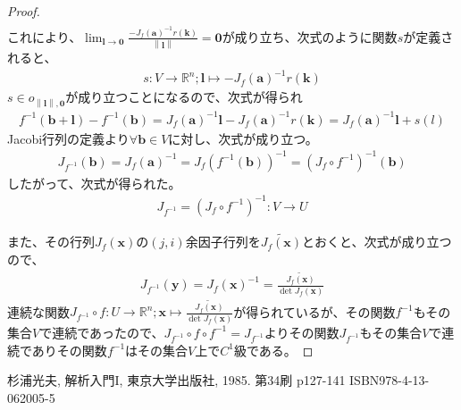 \documentclass[dvipdfmx]{jsarticle}
\begin{document}
\begin{proof}
\begin{align*}
\end{align*}
これにより、$\lim_{\mathbf{l} \rightarrow \mathbf{0}}\frac{- J_{f}\left( \mathbf{a} \right)^{- 1}r\left( \mathbf{k} \right)}{\left\| \mathbf{l} \right\|} = \mathbf{0}$が成り立ち、次式のように関数$s$が定義されると、
\begin{align*}
s:V \rightarrow \mathbb{R}^{n};\mathbf{l} \mapsto - J_{f}\left( \mathbf{a} \right)^{- 1}r\left( \mathbf{k} \right)
\end{align*}
$s \in o_{\left\| \mathbf{l} \right\|,\mathbf{0}}$が成り立つことになるので、次式が得られ
\begin{align*}
f^{- 1}\left( \mathbf{b} + \mathbf{l} \right) - f^{- 1}\left( \mathbf{b} \right) = J_{f}\left( \mathbf{a} \right)^{- 1}\mathbf{l} - J_{f}\left( \mathbf{a} \right)^{- 1}r\left( \mathbf{k} \right) = J_{f}\left( \mathbf{a} \right)^{- 1}\mathbf{l} + s(l)
\end{align*}
Jacobi行列の定義より$\forall\mathbf{b} \in V$に対し、次式が成り立つ。
\begin{align*}
J_{f^{- 1}}\left( \mathbf{b} \right) = J_{f}\left( \mathbf{a} \right)^{- 1} = J_{f}\left( f^{- 1}\left( \mathbf{b} \right) \right)^{- 1} = \left( J_{f} \circ f^{- 1} \right)^{- 1}\left( \mathbf{b} \right)
\end{align*}
したがって、次式が得られた。
\begin{align*}
J_{f^{- 1}} = \left( J_{f} \circ f^{- 1} \right)^{- 1}:V \rightarrow U
\end{align*}\par
また、その行列$J_{f}\left( \mathbf{x} \right)$の$(j,i)$余因子行列を$\widetilde{J_{f}\left( \mathbf{x} \right)}$とおくと、次式が成り立つので、
\begin{align*}
J_{f^{- 1}}\left( \mathbf{y} \right) = J_{f}\left( \mathbf{x} \right)^{- 1} = \frac{\widetilde{J_{f}\left( \mathbf{x} \right)}}{\det{J_{f}\left( \mathbf{x} \right)}}
\end{align*}
連続な関数$J_{f^{- 1}} \circ f:U \rightarrow \mathbb{R}^{n};\mathbf{x} \mapsto \frac{\widetilde{J_{f}\left( \mathbf{x} \right)}}{\det{J_{f}\left( \mathbf{x} \right)}}$が得られているが、その関数$f^{- 1}$もその集合$V$で連続であったので、$J_{f^{- 1}} \circ f \circ f^{- 1} = J_{f^{- 1}}$よりその関数$J_{f^{- 1}}$もその集合$V$で連続でありその関数$f^{- 1}$はその集合$V$上で$C^{1}$級である。
\end{proof}
\begin{thebibliography}{50}
  杉浦光夫, 解析入門I, 東京大学出版社, 1985. 第34刷 p127-141 ISBN978-4-13-062005-5
\end{thebibliography}
\end{document}
